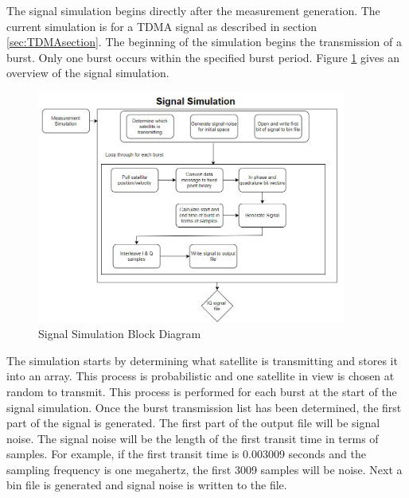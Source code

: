 \documentclass[12pt]{report}
\begin{document}
The signal simulation begins directly after the measurement generation. The current simulation is for a TDMA signal as described in section \ref{sec:TDMAsection}. The beginning of the simulation begins the transmission of a burst. Only one burst occurs within the specified burst period. Figure \ref{fig:SigSimBlock} gives an overview of the signal simulation.

\begin{figure}[h]
    \centering
    \includegraphics[width=4in]{SignalSimBlock}
    \caption{Signal Simulation Block Diagram}
    \label{fig:SigSimBlock}
\end{figure}



The simulation starts by determining what satellite is transmitting and stores it into an array. This process is probabilistic and one satellite in view is chosen at random to transmit. This process is performed for each burst at the start of the signal simulation. Once the burst transmission list has been determined, the first part of the signal is generated. The first part of the output file will be signal noise. The signal noise will be the length of the first transit time in terms of samples. For example, if the first transit time is 0.003009 seconds and the sampling frequency is one megahertz, the first 3009 samples will be noise. Next a bin file is generated and signal noise is written to the file. 
\end{document}
